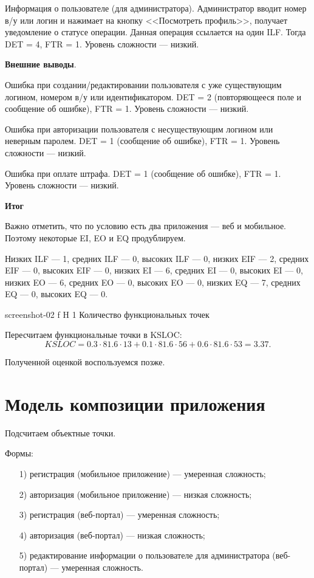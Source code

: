 \documentclass{bmstu}
\begin{document}
Информация о пользователе (для администратора). 
Администратор вводит номер в/у или логин и нажимает на кнопку <<Посмотреть профиль>>, получает уведомление о статусе операции. 
Данная операция ссылается на один ILF. 
Тогда DET = 4, FTR = 1. 
Уровень сложности --- низкий.

\textbf{Внешние выводы}.

Ошибка при создании/редактировании пользователя с уже существующим логином, номером в/у или идентификатором. 
DET = 2 (повторяющееся поле и сообщение об ошибке), FTR = 1.
Уровень сложности --- низкий.

Ошибка при авторизации пользователя с несуществующим логином или неверным паролем. 
DET = 1 (сообщение об ошибке), FTR = 1.
Уровень сложности --- низкий.

Ошибка при оплате штрафа. 
DET = 1 (сообщение об ошибке), FTR = 1.
Уровень сложности --- низкий.

\textbf{Итог}

Важно отметить, что по условию есть два приложения --- веб и мобильное. 
Поэтому некоторые EI, EO и EQ продублируем.

Низких ILF --- 1, средних ILF --- 0, высоких ILF --- 0, низких EIF --- 2, средних EIF --- 0, высоких EIF --- 0, низких EI --- 6, средних EI --- 0, высоких EI --- 0, низких EO --- 6, средних EO --- 0, высоких EO --- 0, низких EQ --- 7, средних EQ --- 0, высоких EQ --- 0.

    {screenshot-02}
    {f}
    {H}
    {1\textwidth}
    {Количество функциональных точек}
    
Пересчитаем функциональные точки в KSLOC:
\begin{equation}
KSLOC = 0.3 \cdot 81.6 \cdot 13 + 0.1 \cdot 81.6 \cdot 56 + 0.6 \cdot 81.6 \cdot 53 = 3.37.
\end{equation}

Полученной оценкой воспользуемся позже.

\section{Модель композиции приложения}

Подсчитаем объектные точки.

Формы:
\begin{enumerate}
\item[1)] регистрация (мобильное приложение) --- умеренная сложность;
\item[2)] авторизация (мобильное приложение) --- низкая сложность;
\item[3)] регистрация (веб-портал) --- умеренная сложность;
\item[4)] авторизация (веб-портал) --- низкая сложность;
\item[5)] редактирование информации о пользователе для администратора (веб-портал) --- умеренная сложность.
\end{enumerate}
\end{document}
